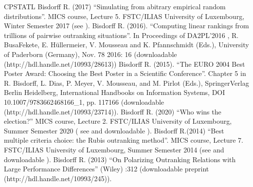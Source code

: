 \documentclass[a4paper,12pt,english]{sphinxhowto}
\begin{document}
\begin{sphinxthebibliography}{CPSTAT\sphinxhyphen{}L}
Bisdorff R. (2017) “Simulating from abitrary empirical random distributions”. MICS  course, Lecture 5. FSTC/ILIAS University of Luxembourg, Winter Semester 2017 (see ).
Bisdorff R. (2016). “Computing linear rankings from trillions of pairwise outranking situations”. In Proceedings of DA2PL’2016 , R. Busa\sphinxhyphen{}Fekete, E. Hüllermeier, V. Mousseau and K. Pfannschmidt (Eds.), University of Paderborn (Germany), Nov. 7\sphinxhyphen{}8 2016: 1\sphinxhyphen{}6 (downloadable  (http://hdl.handle.net/10993/28613))
Bisdorff R. (2015). “The EURO 2004 Best Poster Award: Choosing the Best Poster in a Scientific Conference”. Chapter 5 in R. Bisdorff, L. Dias, P. Meyer, V. Mousseau, and M. Pirlot (Eds.),  Springer\sphinxhyphen{}Verlag Berlin Heidelberg, International Handbooks on Information Systems, DOI 10.1007/978\sphinxhyphen{}3\sphinxhyphen{}662\sphinxhyphen{}46816\sphinxhyphen{}6\_1, pp. 117\sphinxhyphen{}166 (downloadable  (http://hdl.handle.net/10993/23714)).
Bisdorff R. (2020)  “Who wins the election?” MICS  course, Lecture 2. FSTC/ILIAS University of Luxembourg, Summer Semester 2020 ( see  and downloadable ).
Bisdorff R.(2014)  “Best multiple criteria choice: the Rubis outranking method”. MICS  course, Lecture 7. FSTC/ILIAS University of Luxembourg, Summer Semester 2014 (see  and downloadable ).
Bisdorff R. (2013) “On Polarizing Outranking Relations with Large Performance Differences”  (Wiley) :3\sphinxhyphen{}12 (downloadable preprint  (http://hdl.handle.net/10993/245)).

\end{sphinxthebibliography}
\end{document}
